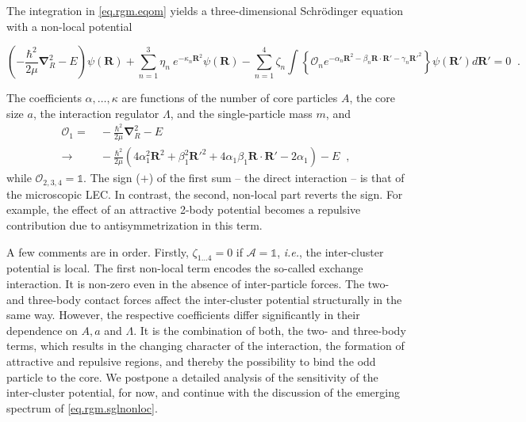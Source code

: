 \documentclass
[aps,nofootinbib,prl,showpacs,twocolumn,groupedaddress,superscriptaddress]
{revtex4}
\newcommand{\la}{\label}
\newcommand{\be}{\begin{equation}}
\newcommand{\ee}{\end{equation}}
\newcommand{\ie}{\textit{i.e.}\;}
\newcommand{\ve}[1]{\ensuremath{\boldsymbol{#1}}}
\begin{document}
The integration in \eqref{eq.rgm.eqom} yields a three-dimensional 
Schr\"odinger equation with a non-local potential
\begin{widetext}
\be\label{eq.rgm.sglnonloc}
\left(-\frac{\hbar^2}{2\mu}\ve{\nabla}_R^2-E\right)\psi(\ve{R})+\sum_{n=1}^3\eta_n~e^{-\kappa_n\ve{R}^2}\psi(\ve{R})-
\sum_{n=1}^4\zeta_n\int\left\lbrace\mathcal{O}_ne^{-\alpha_n\ve{R}^2-\beta_n\ve{R}\cdot\ve{R}'-\gamma_n\ve{R}'^2}\right\rbrace\psi(\ve{R}') d\ve{R}'=0\;\;.
\ee
\end{widetext}
The coefficients $\alpha,\ldots,\kappa$ are functions of the number of
core particles $A$,
the core size $a$, the interaction regulator $\Lambda$,
and the single-particle mass $m$, and 
\begin{align}\la{eq.exop}
\mathcal{O}_1=&~-\frac{\hbar^2}{2\mu}\ve{\nabla}_R^2-E\\
\to&~-\frac{\hbar^2}{2\mu}\left(4\alpha_1^2\ve{R}^2+\beta_1^2\ve{R}'^2
+4\alpha_1\beta_1\ve{R}\cdot\ve{R}'-2\alpha_1\right)-E\;\;,\nonumber
\end{align}
while $\mathcal{O}_{2,3,4}=\mathbb{1}$. The sign ($+$) of the first sum -- the direct
interaction -- is that of the microscopic LEC. In contrast, the second, non-local
part reverts the sign. For example, the effect of an attractive 2-body potential
becomes a repulsive contribution due to antisymmetrization in this term.

A few comments are in order. Firstly, $\zeta_{1\ldots4}=0$ if $\mathcal{A}=\mathbb{1}$, \ie, the
inter-cluster potential is local. The first non-local term encodes the so-called exchange interaction.
It is non-zero even in the absence of inter-particle forces. The two- and three-body
contact forces affect the inter-cluster potential structurally in the same way. However, the respective
coefficients differ significantly in their dependence on $A,a$ and $\Lambda$. It is the combination
of both, the two- and three-body terms, which results in the changing character of the interaction,
the formation of attractive and repulsive regions, and thereby the possibility to bind the odd particle
to the core. We postpone a detailed analysis of the sensitivity of the inter-cluster potential,
for now, and continue with the discussion of the emerging spectrum of \eqref{eq.rgm.sglnonloc}.
\end{document}
